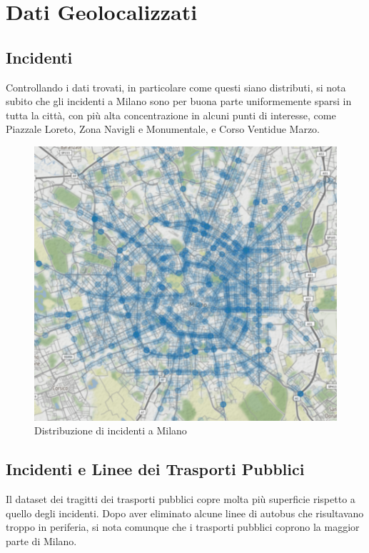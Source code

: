 \documentclass[a4paper]{report}
\begin{document}
\chapter{Dati Geolocalizzati}

\section{Incidenti}

Controllando i dati trovati, in particolare come questi siano distributi, 
si nota subito che gli incidenti a Milano sono per buona parte uniformemente sparsi in tutta la città, 
con più alta concentrazione in alcuni punti di interesse, come Piazzale Loreto, Zona Navigli 
e Monumentale, e Corso Ventidue Marzo.

\begin{figure}
    \includegraphics[width=\linewidth]{../src/incidenti/geo_incidenti.png}
    \caption{Distribuzione di incidenti a Milano}
    \label{fig:geo_incidenti}
\end{figure}




\section{Incidenti e Linee dei Trasporti Pubblici}

Il dataset dei tragitti dei trasporti pubblici copre molta più superficie rispetto a 
quello degli incidenti.
Dopo aver eliminato alcune linee di autobus che risultavano troppo in periferia, 
si nota comunque che i trasporti pubblici coprono la maggior parte di Milano.
\end{document}
